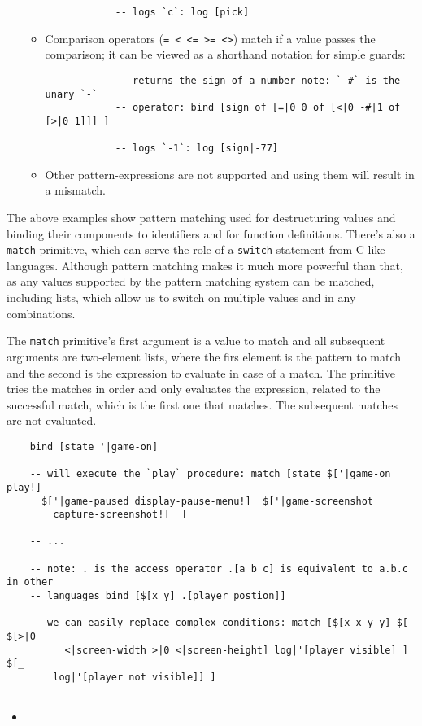 \begin{itemize}
\begin{itemize}
\begin{lstlisting}
            -- logs `c`: log [pick]
        \end{lstlisting}
        \item Comparison operators (\texttt{= < <= >= <>}) match if a value
          passes the comparison; it can be viewed as a shorthand notation for
          simple
          guards\cite[Chapter~Pattern Matching Basics, Section Using Guards within Patterns]{f_sharp_wikibooks}:
        \begin{lstlisting}
            -- returns the sign of a number note: `-#` is the unary `-`
            -- operator: bind [sign of [=|0 0 of [<|0 -#|1 of [>|0 1]]] ]
            
            -- logs `-1`: log [sign|-77]
        \end{lstlisting}
        \item Other pattern-expressions are not supported and using them will
          result in a mismatch.
    \end{itemize}
\end{itemize}

The above examples show pattern matching used for destructuring values and
binding their components to identifiers and for function definitions. There's
also a \texttt{match} primitive, which can serve the role of a \texttt{switch}
statement from C-like languages. Although pattern matching makes it much more
powerful than that, as any values supported by the pattern matching system can
be matched, including lists, which allow us to switch on multiple values and in
any combinations.

The \texttt{match} primitive's first argument is a value to match and all
subsequent arguments are two-element lists, where the firs element is the
pattern to match and the second is the expression to evaluate in case of a
match. The primitive tries the matches in order and only evaluates the
expression, related to the successful match, which is the first one that
matches. The subsequent matches are not evaluated.

\begin{lstlisting}
    bind [state '|game-on]
    
    -- will execute the `play` procedure: match [state $['|game-on play!]
      $['|game-paused display-pause-menu!]  $['|game-screenshot
        capture-screenshot!]  ]
    
    -- ...

    -- note: . is the access operator .[a b c] is equivalent to a.b.c in other
    -- languages bind [$[x y] .[player postion]]
    
    -- we can easily replace complex conditions: match [$[x x y y] $[ $[>|0
          <|screen-width >|0 <|screen-height] log|'[player visible] ] $[_
        log|'[player not visible]] ]
    
\end{lstlisting}
\begin{itemize}
    \item 
\end{itemize}

